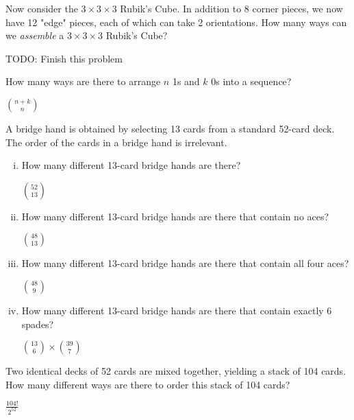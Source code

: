 \documentclass[11pt]{article}
\begin{document}
\begin{Parts}
    \Part Now consider the $3\times3\times3$ Rubik's Cube. In addition to 8 corner pieces, we 
    now have 12 "edge" pieces, each of which can take 2 orientations. How many ways can we 
    \emph{assemble} a $3\times3\times3$ Rubik's Cube?
    \begin{Answer}
        TODO: Finish this problem
    \end{Answer}

\end{Parts}

\newpage
{}

\begin{Parts}

    \Part How many ways are there to arrange $n$ 1s and $k$ 0s into a sequence?
    \begin{Answer}
        ${n + k \choose n}$
    \end{Answer}

    \Part A bridge hand is obtained by selecting 13 cards from a standard
    52-card deck. The order of the cards in a bridge hand is
    irrelevant. 
    \begin{enumerate}[(i)]
        \item How many different 13-card bridge hands are there? 
        \begin{Answer}
            ${52 \choose 13}$
        \end{Answer}

        \item How many different 13-card bridge hands are there that contain no aces? 
        \begin{Answer}
            ${48 \choose 13}$
        \end{Answer}

        \item How many different 13-card bridge hands are there that contain all four aces? 
        \begin{Answer}
            ${48 \choose 9}$
        \end{Answer}

        \item How many different 13-card bridge hands are there that contain exactly 6 spades?
        \begin{Answer}
            ${13 \choose 6} \times {39 \choose 7}$
        \end{Answer}
    \end{enumerate}

    \Part Two identical decks of 52 cards are mixed together, yielding a stack of 104 cards. 
    How many different ways are there to order this stack of 104 cards?
    \begin{Answer}
        ${\frac{104!}{2^{52}}}$
    \end{Answer}
    

\end{Parts}
\end{document}
